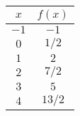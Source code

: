 \begin{tabular}{cc} \toprule
$x$  & $f(x)$   \\\midrule
$-1$ & $-1$     \\
$0$  & $1 / 2$  \\
$1$  & $2$      \\
$2$  & $7 / 2$  \\
$3$  & $5$      \\
$4$  & $13 / 2$ \\\bottomrule
\end{tabular}

